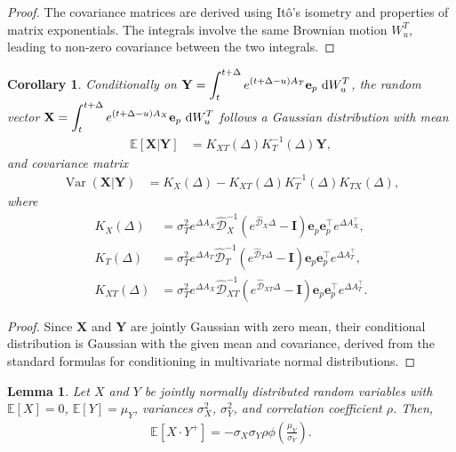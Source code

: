 \documentclass[10pt,a4paper,reqno]{amsart}
\newtheorem{corollary}[theorem]{Corollary}
\newtheorem{lemma}[theorem]{Lemma}
\theoremstyle{example}
\newcommand*\D{\mathop{}\!\textnormal{d}}
\begin{document}
\begin{proof}
The covariance matrices are derived using Itô's isometry and properties of matrix exponentials. The integrals involve the same Brownian motion $W_u^T$, leading to non-zero covariance between the two integrals.
\end{proof}

\begin{corollary}\label{cor:conditional-distribution}
Conditionally on $\displaystyle \mathbf{Y} = \int_t^{t+\Delta} e^{(t+\Delta - u)
  A_T} \textbf{e}_p \, \D W_u^T$, the random vector $\displaystyle \mathbf{X} =
\int_t^{t+\Delta} e^{(t+\Delta - u) A_X} \textbf{e}_p \, \D W_u^T$ follows a
Gaussian distribution with mean  
\begin{align}
\mathbb{E}\left[ \mathbf{X} \Big| \mathbf{Y} \right] &= K_{XT}(\Delta) K_T^{-1}(\Delta) \mathbf{Y},
\end{align}
and covariance matrix
\begin{align}
\operatorname{Var}\left( \mathbf{X} \Big| \mathbf{Y} \right) &= K_X(\Delta) - K_{XT}(\Delta) K_T^{-1}(\Delta) K_{TX}(\Delta),
\end{align}
where
\begin{align*}
K_X(\Delta) &= \sigma_T^2 e^{\Delta A_X} \hat{\mathcal{D}}_X^{-1} \left( e^{\hat{\mathcal{D}}_X \Delta} - \mathbf{I} \right) \mathbf{e}_p \mathbf{e}_p^\intercal e^{\Delta A_X^\intercal}, \\
K_T(\Delta) &= \sigma_T^2 e^{\Delta A_T} \hat{\mathcal{D}}_T^{-1} \left( e^{\hat{\mathcal{D}}_T \Delta} - \mathbf{I} \right) \mathbf{e}_p \mathbf{e}_p^\intercal e^{\Delta A_T^\intercal}, \\
K_{XT}(\Delta) &= \sigma_T^2 e^{\Delta A_X} \hat{\mathcal{D}}_{XT}^{-1} \left( e^{\hat{\mathcal{D}}_{XT} \Delta} - \mathbf{I} \right) \mathbf{e}_p \mathbf{e}_p^\intercal e^{\Delta A_T^\intercal}.
\end{align*}
\end{corollary}

\begin{proof}
Since $\mathbf{X}$ and $\mathbf{Y}$ are jointly Gaussian with zero mean, their
conditional distribution is Gaussian with the given mean and covariance, derived
from the standard formulas for conditioning in multivariate normal
distributions. 
\end{proof}

\begin{lemma}
Let $X$ and $Y$ be jointly normally distributed random variables with $\mathbb{E}[X] = 0$, $\mathbb{E}[Y] = \mu_Y$, variances $\sigma_X^2$, $\sigma_Y^2$, and correlation coefficient $\rho$. Then,
\begin{align}
\mathbb{E}[ X \cdot Y^+ ] = -\sigma_X \sigma_Y \rho \phi\left( \frac{\mu_Y}{\sigma_Y} \right).
\end{align}
\end{lemma}
\end{document}
